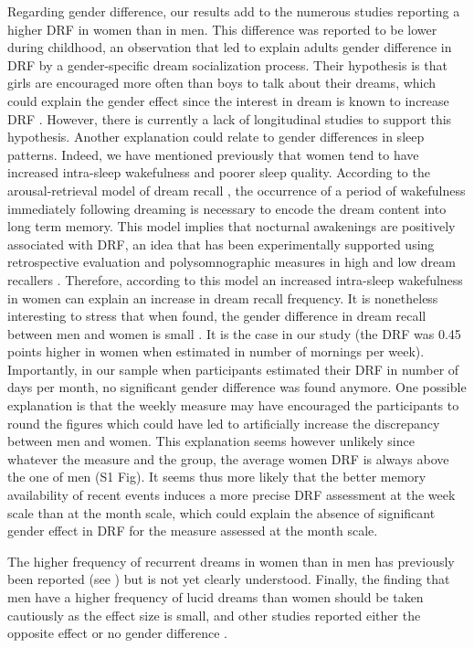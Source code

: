 Regarding gender difference, our results add to the numerous studies reporting a higher DRF in women than in men. This difference was reported to be lower during childhood, an observation that led \citep{schredl_gender_2008} to explain adults gender difference in DRF by a gender-specific dream socialization process. Their hypothesis is that girls are encouraged more often than boys to talk about their dreams, which could explain the gender effect since the interest in dream is known to increase DRF \citep{schredl_factors_2003}. However, there is currently a lack of longitudinal studies to support this hypothesis. Another explanation could relate to gender differences in sleep patterns. Indeed, we have mentioned previously that women tend to have increased intra-sleep wakefulness and poorer sleep quality. According to the arousal-retrieval model of dream recall \citep{koulack_dream_1976}, the occurrence of a period of wakefulness immediately following dreaming is necessary to encode the dream content into long term memory. This model implies that nocturnal awakenings are positively associated with DRF, an idea that has been experimentally supported using retrospective evaluation \citep{schredl_factors_2003} and polysomnographic measures in high and low dream recallers \citep{eichenlaub_brain_2014, vallat_increased_2017}. Therefore, according to this model an increased intra-sleep wakefulness in women can explain an increase in dream recall frequency. It is nonetheless interesting to stress that when found, the gender difference in dream recall between men and women is small \citep{schredl_gender_2008}. It is the case in our study (the DRF was 0.45 points higher in women when estimated in number of mornings per week). Importantly, in our sample when participants estimated their DRF in number of days per month, no significant gender difference was found anymore. One possible explanation is that the weekly measure may have encouraged the participants to round the figures which could have led to artificially increase the discrepancy between men and women. This explanation seems however unlikely since whatever the measure and the group, the average women DRF is always above the one of men (S1 Fig). It seems thus more likely that the better memory availability of recent events induces a more precise DRF assessment at the week scale than at the month scale, which could explain the absence of significant gender effect in DRF for the measure assessed at the month scale.

The higher frequency of recurrent dreams in women than in men has previously been reported (see \citealp{zadra_recurrent_1996}) but is not yet clearly understood. Finally, the finding that men have a higher frequency of lucid dreams than women should be taken cautiously as the effect size is small, and other studies reported either the opposite effect \citep{schredl_frequency_2011} or no gender difference \citep{schredl_lucid_2004, stepansky_austrian_1998}.

